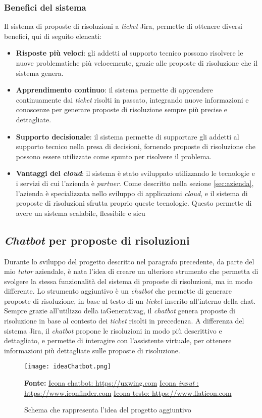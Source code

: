\subsubsection{Benefici del sistema}
Il sistema di proposte di risoluzioni a \textit{ticket} Jira, permette di ottenere diversi benefici, qui di seguito elencati:
\begin{itemize}
    \item \textbf{Risposte più veloci}: gli addetti al supporto tecnico possono risolvere le nuove problematiche più velocemente, grazie alle proposte di risoluzione che il sistema genera.
    \item \textbf{Apprendimento continuo}: il sistema permette di apprendere continuamente dai \textit{ticket} risolti in passato, integrando nuove informazioni e conoscenze per generare proposte di risoluzione sempre più precise e dettagliate.
    \item \textbf{Supporto decisionale}: il sistema permette di supportare gli addetti al supporto tecnico nella presa di decisioni, fornendo proposte di risoluzione che possono essere utilizzate come spunto per risolvere il problema.
    \item \textbf{Vantaggi del \textit{cloud}}: il sistema è stato sviluppato utilizzando le tecnologie e i servizi di cui l'azienda è \textit{partner}. Come descritto nella sezione \ref{sec:azienda}, l'azienda è specializzata nello sviluppo di applicazioni \textit{cloud}, e il sistema di proposte di risoluzioni sfrutta proprio queste tecnologie. Questo permette di avere un sistema scalabile, flessibile e sicu
\end{itemize}
\subsection{\textit{Chatbot} per proposte di risoluzioni}
Durante lo sviluppo del progetto descritto nel paragrafo precedente, da parte del mio \textit{tutor} aziendale, è nata l'idea di creare un ulteriore strumento che permetta di svolgere la stessa funzionalità del sistema di proposte di risoluzioni, ma in modo differente. Lo strumento aggiuntivo è un \textit{chatbot} che permette di generare proposte di risoluzione, in base al testo di un \textit{ticket} inserito all'interno della chat. 
Sempre grazie all'utilizzo della \gls{iaGenerativag}, il \textit{chatbot} genera proposte di risoluzione in base al contesto dei \textit{ticket} risolti in precedenza. A differenza del sistema Jira, il \textit{chatbot} propone le risoluzioni in modo più descrittivo e dettagliato, e permette di interagire con l'assistente virtuale, per ottenere informazioni più dettagliate sulle proposte di risoluzione.
\begin{figure}[H]
    \centering
    \texttt{[image: ideaChatbot.png]}
    \caption{Schema che rappresenta l'idea del progetto aggiuntivo}
    \label{fig:ideaChatbot}
    \small \textbf{Fonte:} \href{https://uxwing.com/chatbot-icon/}{Icona chatbot: https://uxwing.com} \href{https://www.iconfinder.com/icons/351012/field_input_search_icon}{Icona \textit{input} : https://www.iconfinder.com} \href{https://www.flaticon.com/free-icon/text-file_5116156} {Icona testo: https://www.flaticon.com}
\end{figure}
